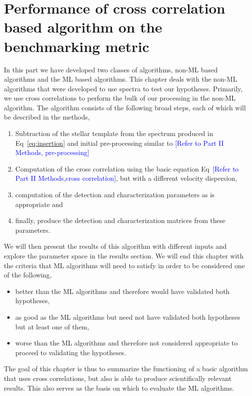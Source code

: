 \chapter{Performance of cross correlation based algorithm on the benchmarking metric}
\label{chap:III.4}
In this part we have developed two classes of algorithms, non-ML based algorithms and the ML based algorithms.
This chapter deals with the non-ML algorithms that were developed to use spectra to test our hypotheses.
Primarily, we use cross correlations to perform the bulk of our processing in the non-ML algorithm.
The algorithm consists of the following broad steps, each of which will be described in the methods,
\begin{enumerate}
    \item Subtraction of the stellar template from the spectrum produced in Eq~\ref{eq:insertion} and initial pre-processing similar to \textcolor{blue}{[Refer to Part II Methods, pre-processing]}
    \item Computation of the cross correlation using the basic equation Eq~\textcolor{blue}{[Refer to Part II Methods,cross correlation]}, but with a different velocity dispersion,
    \item computation of the detection and characterization parameters as is appropriate and 
    \item finally, produce the detection and characterization matrices from these parameters.
\end{enumerate}
We will then present the results of this algorithm with different inputs and explore the parameter space in the results section.
We will end this chapter with the criteria that ML algorithms will need to satisfy in order to be considered one of the following,
\begin{itemize}
    \item better than the ML algorithms and therefore would have validated both hypotheses,
    \item as good as the ML algorithms but need not have validated both hypotheses but at least one of them,
    \item worse than the ML algorithms and therefore not considered appropriate to proceed to validating the hypotheses.
\end{itemize}
The goal of this chapter is thus to summarize the functioning of a basic algorithm that uses cross correlations, but also is able to produce scientifically relevant results.
This also serves as the basis on which to evaluate the ML algorithms.

